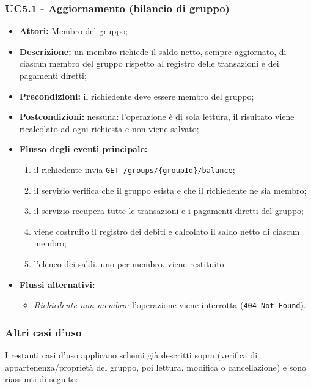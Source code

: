 \subsubsection{UC5.1 - Aggiornamento (bilancio di gruppo)}
\begin{itemize}
    \item \textbf{Attori:} Membro del gruppo;
    \item \textbf{Descrizione:} un membro richiede il saldo netto, sempre aggiornato, di ciascun membro del gruppo rispetto al registro delle transazioni e dei pagamenti diretti;
    \item \textbf{Precondizioni:} il richiedente deve essere membro del gruppo;
    \item \textbf{Postcondizioni:} nessuna: l'operazione è di sola lettura, il risultato viene ricalcolato ad ogni richiesta e non viene salvato;
    \item \textbf{Flusso degli eventi principale:}
    \begin{enumerate}
        \item il richiedente invia \texttt{GET \url{/groups/{groupId}/balance}};
        \item il servizio verifica che il gruppo esista e che il richiedente ne sia membro;
        \item il servizio recupera tutte le transazioni e i pagamenti diretti del gruppo;
        \item viene costruito il registro dei debiti e calcolato il saldo netto di ciascun membro;
        \item l'elenco dei saldi, uno per membro, viene restituito.
    \end{enumerate}
    \item \textbf{Flussi alternativi:}
    \begin{itemize}
        \item \emph{Richiedente non membro:} l'operazione viene interrotta (\texttt{404 Not Found}).
    \end{itemize}
\end{itemize}

\subsubsection{Altri casi d'uso}
I restanti casi d'uso applicano schemi già descritti sopra (verifica di appartenenza/proprietà del gruppo, poi lettura, modifica o cancellazione) e sono riassunti di seguito:

